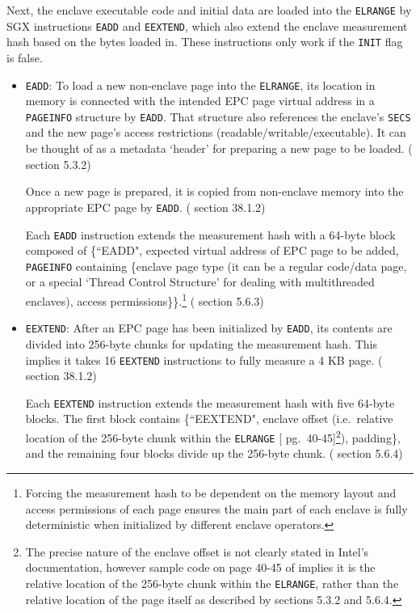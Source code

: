 Next, the enclave executable code and initial data are loaded into the {\tt ELRANGE} by SGX instructions {\tt EADD} and {\tt EEXTEND}, which also extend the enclave measurement hash based on the bytes loaded in. These instructions only work if the {\tt INIT} flag is false.

\begin{itemize}
    \item {\tt EADD}: To load a new non-enclave page into the {\tt ELRANGE}, its location in memory is connected with the intended EPC page virtual address in a {\tt PAGEINFO} structure by {\tt EADD}. That structure also references the enclave's {\tt SECS} and the new page's access restrictions (readable/writable/executable). It can be thought of as a metadata `header' for preparing a new page to be loaded. (\cite{intel-sgx-explained-advanced} section 5.3.2)

    Once a new page is prepared, it is copied from non-enclave memory into the appropriate EPC page by {\tt EADD}. (\cite{sgx-manual} section 38.1.2)

    Each {\tt EADD} instruction extends the measurement hash with a 64-byte block composed of \{``EADD", expected virtual address of EPC page to be added, {\tt PAGEINFO} containing \{enclave page type (it can be a regular code/data page, or a special `Thread Control Structure' for dealing with multithreaded enclaves), access permissions\}\}.\footnote{Forcing the measurement hash to be dependent on the memory layout and access permissions of each page ensures the main part of each enclave is fully deterministic when initialized by different enclave operators.} (\cite{intel-sgx-explained-advanced} section 5.6.3)

    \item {\tt EEXTEND}: After an EPC page has been initialized by {\tt EADD}, its contents are divided into 256-byte chunks for updating the measurement hash. This implies it takes 16 {\tt EEXTEND} instructions to fully measure a 4 KB page. (\cite{sgx-manual} section 38.1.2)

    Each {\tt EEXTEND} instruction extends the measurement hash with five 64-byte blocks. The first block contains \{``EEXTEND", enclave offset (i.e.\ relative location of the 256-byte chunk within the {\tt ELRANGE} [\cite{sgx-manual} pg.\ 40-45]\footnote{The precise nature of the enclave offset is not clearly stated in Intel's documentation, however sample code on page 40-45 of \cite{sgx-manual} implies it is the relative location of the 256-byte chunk within the {\tt ELRANGE}, rather than the relative location of the page itself as described by \cite{intel-sgx-explained-advanced} sections 5.3.2 and 5.6.4.}), padding\}, and the remaining four blocks divide up the 256-byte chunk. (\cite{intel-sgx-explained-advanced} section 5.6.4)
\end{itemize}

